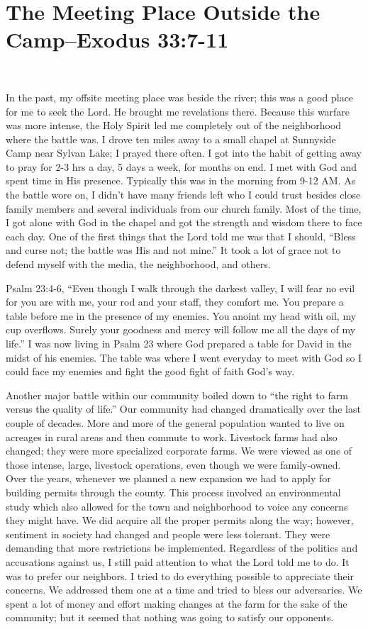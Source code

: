 \documentclass[oneside]{book}
\begin{document}
\section{The Meeting Place Outside the Camp--Exodus 33:7-11}
\

In the past, my offsite meeting place was beside the river; this was a good place for me to seek the Lord. He brought me revelations there. Because this warfare was more intense, the Holy Spirit led me completely out of the neighborhood where the battle was. I drove ten miles away to a small chapel at Sunnyside Camp near Sylvan Lake; I prayed there often. I got into the habit of getting away to pray for 2-3 hrs a day, 5 days a week, for months on end. I met with God and spent time in His presence. Typically this was in the morning from 9-12 AM. As the battle wore on, I didn't have many friends left who I could trust besides close family members and several individuals from our church family. Most of the time, I got alone with God in the chapel and got the strength and wisdom there to face each day. One of the first things that the Lord told me was that I should, “Bless and curse not; the battle was His and not mine.” It took a lot of grace not to defend myself with the media, the neighborhood, and others.


Psalm 23:4-6, “Even though I walk through the darkest valley, I will fear no evil for you are with me, your rod and your staff, they comfort me. You prepare a table before me in the presence of my enemies. You anoint my head with oil, my cup overflows. Surely your goodness and mercy will follow me all the days of my life.” I was now living in Psalm 23 where God prepared a table for David in the midst of his enemies. The table was where I went everyday to meet with God so I could face my enemies and fight the good fight of faith God’s way.

Another major battle within our community boiled down to “the right to farm versus the quality of life.” Our community had changed dramatically over the last couple of decades. More and more of the general population wanted to live on acreages in rural areas and then commute to work. Livestock farms had also changed; they were more specialized corporate farms. We were viewed as one of those intense, large, livestock operations, even though we were family-owned. Over the years, whenever we planned a new expansion we had to apply for building permits through the county. This process involved an environmental study which also allowed for the town and neighborhood to voice any concerns they might have. We did acquire all the proper permits along the way; however, sentiment in society had changed and people were less tolerant. They were demanding that more restrictions be implemented. Regardless of the politics and accusations against us, I still paid attention to what the Lord told me to do. It was to prefer our neighbors. I tried to do everything possible to appreciate their concerns. We addressed them one at a time and tried to bless our adversaries. We spent a lot of money and effort making changes at the farm for the sake of the community; but it seemed that nothing was going to satisfy our opponents. 
\end{document}
